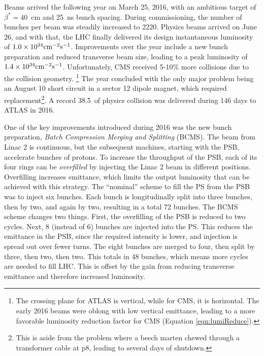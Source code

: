 Beams arrived the following year on March 25, 2016, with an ambitious target of $\beta^*=40$~cm and 25~ns bunch spacing.
During commissioning, the number of bunches per beam was steadily increased to 2220.
Physics beams arrived on June 26, and with that, the LHC finally delivered its design instantaneous luminosity of $1.0\times10^{34}\text{cm}^{-2}\text{s}^{-1}$.
Improvements over the year include a new bunch preparation and reduced transverse beam size, leading to a peak luminosity of $1.4\times10^{34}\text{cm}^{-2}\text{s}^{-1}$. \cite{lhcRun2}
Unfortunately, CMS received 5-10\% more collisions due to the collision geometry. \footnote{The crossing plane for ATLAS is vertical, while for CMS, it is horizontal. The early 2016 beams were oblong with low vertical emittance, leading to a more favorable luminosity reduction factor for CMS (Equation \ref{eqn:lumiReduce}).}
The year concluded with the only major problem being an August 10 short circuit in a sector 12 dipole magnet, which required replacement\footnote{This is aside from the problem where a beech marten chewed through a transformer cable at p8, leading to several days of shutdown.}.
A record 38.5~\fb of physics collision was delivered during 146 days to ATLAS in 2016.

One of the key improvements introduced during 2016 was the new bunch preparation, \emph{Batch Compression Merging and Splitting} (BCMS).
The beam from Linac 2 is continuous, but the subsequent machines, starting with the PSB, accelerate bunches of protons. \cite{freyermuth}
To increase the throughput of the PSB, each of its four rings can be \emph{overfilled} by injecting the Linac 2 beam in different positions.
Overfilling increases emittance, which limits the output luminosity that can be achieved with this strategy.
The ``nominal'' scheme to fill the PS from the PSB was to inject six bunches.
Each bunch is longitudinally split into three bunches, then by two, and again by two, resulting in a total 72 bunches. \cite{freyermuth}
The BCMS scheme changes two things.
First, the overfilling of the PSB is reduced to two cycles.
Next, 8 (instead of 6) bunches are injected into the PS.
This reduces the emittance in the PSB, since the required intensity is lower, and injection is spread out over fewer turns.
The eight bunches are merged to four, then split by three, then two, then two.
This totals in 48 bunches, which means more cycles are needed to fill LHC.
This is offset by the gain from reducing transverse emittance and therefore increased luminosity. \cite{freyermuth}


